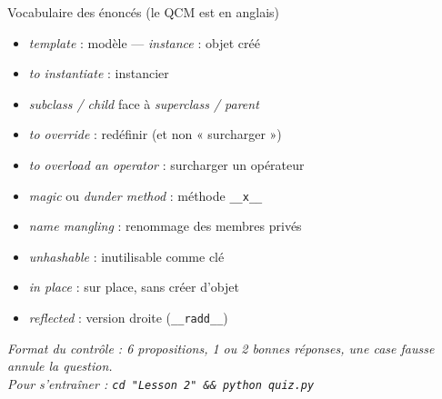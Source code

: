 \documentclass[a4paper,10pt]{article}
\newcommand{\co}[1]{\texttt{\textcolor{codefg}{#1}}}
\begin{document}
\vspace{0.4em}
\begin{astucebox}{Vocabulaire des énoncés (le QCM est en anglais)}
\begin{minipage}[t]{0.485\linewidth}
\begin{itemize}
  \item \emph{template} : modèle --- \emph{instance} : objet créé
  \item \emph{to instantiate} : instancier
  \item \emph{subclass / child} face à \emph{superclass / parent}
  \item \emph{to override} : redéfinir (et non « surcharger »)
  \item \emph{to overload an operator} : surcharger un opérateur
\end{itemize}
\end{minipage}\hfill
\begin{minipage}[t]{0.485\linewidth}
\begin{itemize}
  \item \emph{magic} ou \emph{dunder method} : méthode \co{\_\_x\_\_}
  \item \emph{name mangling} : renommage des membres privés
  \item \emph{unhashable} : inutilisable comme clé
  \item \emph{in place} : sur place, sans créer d'objet
  \item \emph{reflected} : version droite (\co{\_\_radd\_\_})
\end{itemize}
\end{minipage}
\end{astucebox}

\vspace{0.4em}
\begin{center}
\footnotesize\itshape
Format du contrôle : 6 propositions, 1 ou 2 bonnes réponses, une case fausse
annule la question.\\
Pour s'entraîner : \texttt{cd "Lesson 2" \&\& python quiz.py}
\end{center}
\end{document}
